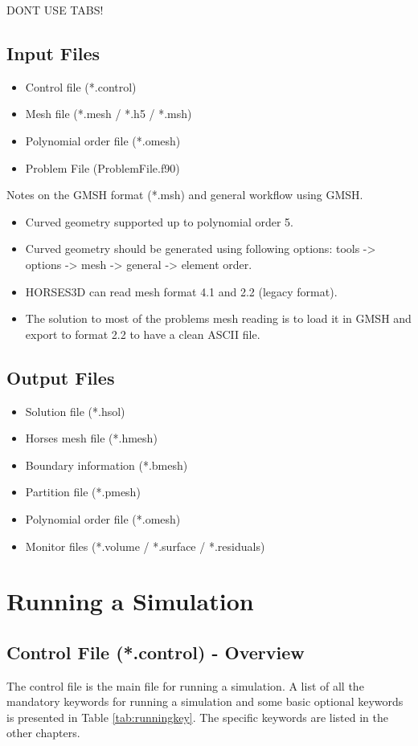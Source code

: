 \documentclass[a4paper,10pt]{report}
\begin{document}
DONT USE TABS!

\section{Input Files}
\begin{itemize}
\item Control file (*.control)
\item Mesh file (*.mesh / *.h5 / *.msh)
\item Polynomial order file (*.omesh)
\item Problem File (ProblemFile.f90)
\end{itemize}

{ \small
Notes on the GMSH format (*.msh) and general workflow using GMSH.
\begin{itemize}
\item Curved geometry supported up to polynomial order 5.
\item Curved geometry should be generated using following options: tools -> options -> mesh -> general -> element order.
\item HORSES3D can read mesh format 4.1 and 2.2 (legacy format).
\item The solution to most of the problems mesh reading is to load it in GMSH and export to format 2.2 to have a clean ASCII file.
\end{itemize}
}

\section{Output Files}
\begin{itemize}
\item Solution file (*.hsol)
\item Horses mesh file (*.hmesh)
\item Boundary information (*.bmesh)
\item Partition file (*.pmesh)
\item Polynomial order file (*.omesh)
\item Monitor files (*.volume / *.surface / *.residuals)
\end{itemize}

\chapter{Running a Simulation}

\section{Control File (*.control) - Overview}
The control file is the main file for running a simulation. A list of all the mandatory keywords for running a simulation and some basic optional keywords is presented in Table \ref{tab:runningkey}. The specific keywords are listed in the other chapters.
\end{document}
